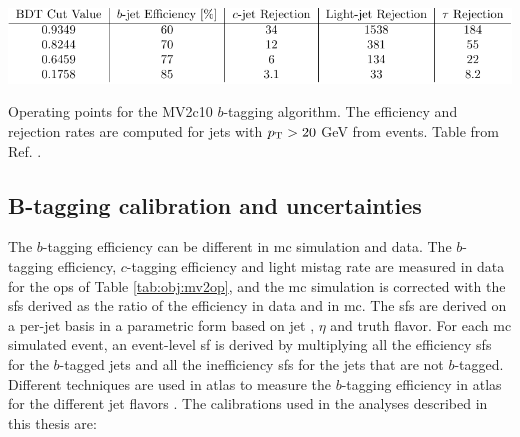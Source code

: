 \begin{table}[h]
\begin{center}
    \includegraphics[width=1.0\textwidth]{figures/objects/btag_op.pdf}  
\end{center}
 \caption{Operating points for the MV2c10 $b$-tagging algorithm. The efficiency and rejection rates are computed for jets with $p_{\rm T} > 20$ GeV from \ttbar events. Table from Ref. \cite{ATL-PHYS-PUB-2016-012}.}
  \label{tab:obj:mv2op}
\end{table}

\subsection{B-tagging calibration and uncertainties}
\label{sec:obj:btaggingcalib}

The $b$-tagging efficiency can be different in \gls{mc} simulation and data. The $b$-tagging efficiency, 
$c$-tagging efficiency and light mistag rate are measured in data for the \glspl{op} of Table \ref{tab:obj:mv2op}, 
and the \gls{mc} simulation is corrected with the \glspl{sf} derived as the ratio of the efficiency in data and in \gls{mc}. 
The \glspl{sf} are derived on a per-jet basis in a parametric form based on jet \pt, $\eta$ and truth flavor. 
For each \gls{mc} simulated event, an event-level \gls{sf} is derived by multiplying all the efficiency \glspl{sf} for the $b$-tagged jets 
and all the inefficiency \glspl{sf} for the jets that are not $b$-tagged. Different techniques are used in \gls{atlas} to measure the $b$-tagging 
efficiency in \gls{atlas} for the different jet flavors \cite{1748-0221-11-04-P04008}.
The calibrations used in the analyses described in this thesis are:


